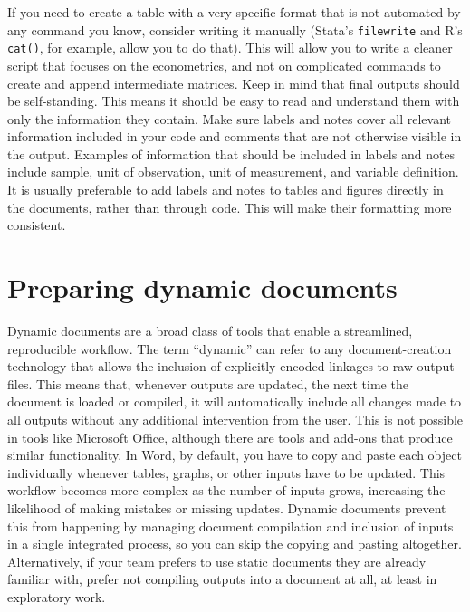 If you need to create a table with a very specific format
that is not automated by any command you know, consider writing it manually
(Stata's \texttt{filewrite} and R's \texttt{cat()}, for example, allow you to do that).
This will allow you to write a cleaner script that focuses on the econometrics,
and not on complicated commands to create and append intermediate matrices.
Keep in mind that final outputs should be self-standing.
This means it should be easy to read and understand them with only the information they contain.
Make sure labels and notes cover all relevant information 
included in your code and comments that are not otherwise visible in the output.
Examples of information that should be included in labels and notes include sample, 
unit of observation, unit of measurement, and variable definition.
It is usually preferable to add labels and notes to tables and figures 
directly in the documents, rather than through code.
This will make their formatting more consistent.

\section{Preparing dynamic documents}

Dynamic documents are a broad class of tools that enable a streamlined, reproducible workflow.
The term ``dynamic'' can refer to any document-creation technology
that allows the inclusion of explicitly encoded linkages to raw output files.
This means that, whenever outputs are updated,
the next time the document is loaded or compiled, it will automatically include
all changes made to all outputs without any additional intervention from the user.
This is not possible in tools like Microsoft Office,
although there are tools and add-ons that produce similar functionality.
In Word, by default, you have to copy and paste each object individually
whenever tables, graphs, or other inputs have to be updated.
This workflow becomes more complex as the number of inputs grows,
increasing the likelihood of making mistakes or missing updates.
Dynamic documents prevent this from happening by managing document compilation and
inclusion of inputs in a single integrated process,
so you can skip the copying and pasting altogether.
Alternatively, if your team prefers to use static documents they are already familiar with,
prefer not compiling outputs into a document at all, at least in exploratory work.

